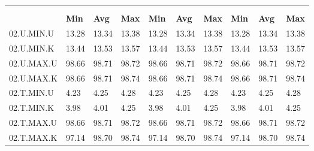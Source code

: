 \begin{tabular}{|>{\raggedright}p{}|>{\raggedright}p{}|>{\raggedright}p{}|>{\raggedright}p{}|>{\raggedright}p{}|>{\raggedright}p{}|>{\raggedright}p{}|>{\raggedright}p{}|>{\raggedright}p{}|>{\raggedright}p{}|}
\hline 
\multirow{3}{0.12\columnwidth}{\textbf{\footnotesize{}Bezeichnung}} & \multicolumn{9}{l|}{\textbf{\footnotesize{}TX-Bitrate {[}MBit/s{]}}}\tabularnewline
\cline{2-10} 
& \multicolumn{3}{l|}{\textbf{\footnotesize{}prp1}} & \multicolumn{3}{l|}{\textbf{\footnotesize{}eth0}} & \multicolumn{3}{l|}{\textbf{\footnotesize{}eth1}}\tabularnewline
\cline{2-10} 
& \textbf{\footnotesize{}Min} & \textbf{\footnotesize{}Avg} & \textbf{\footnotesize{}Max} & \textbf{\footnotesize{}Min} & \textbf{\footnotesize{}Avg} & \textbf{\footnotesize{}Max} & \textbf{\footnotesize{}Min} & \textbf{\footnotesize{}Avg} & \textbf{\footnotesize{}Max}\tabularnewline
\hline 
\hline 
{\footnotesize{}02.U.MIN.U} & {\footnotesize{}13.28} & {\footnotesize{}13.34} & {\footnotesize{}13.38} & {\footnotesize{}13.28} & {\footnotesize{}13.34} & {\footnotesize{}13.38} & {\footnotesize{}13.28} & {\footnotesize{}13.34} & {\footnotesize{}13.38}\tabularnewline
\hline 
\hline 
{\footnotesize{}02.U.MIN.K} & {\footnotesize{}13.44} & {\footnotesize{}13.53} & {\footnotesize{}13.57} & {\footnotesize{}13.44} & {\footnotesize{}13.53} & {\footnotesize{}13.57} & {\footnotesize{}13.44} & {\footnotesize{}13.53} & {\footnotesize{}13.57}\tabularnewline
\hline 
\hline 
{\footnotesize{}02.U.MAX.U} & {\footnotesize{}98.66} & {\footnotesize{}98.71} & {\footnotesize{}98.72} & {\footnotesize{}98.66} & {\footnotesize{}98.71} & {\footnotesize{}98.72} & {\footnotesize{}98.66} & {\footnotesize{}98.71} & {\footnotesize{}98.72}\tabularnewline
\hline 
\hline 
{\footnotesize{}02.U.MAX.K} & {\footnotesize{}98.66} & {\footnotesize{}98.71} & {\footnotesize{}98.74} & {\footnotesize{}98.66} & {\footnotesize{}98.71} & {\footnotesize{}98.74} & {\footnotesize{}98.66} & {\footnotesize{}98.71} & {\footnotesize{}98.74}\tabularnewline
\hline 
\hline 
{\footnotesize{}02.T.MIN.U} & {\footnotesize{}4.23} & {\footnotesize{}4.25} & {\footnotesize{}4.28} & {\footnotesize{}4.23} & {\footnotesize{}4.25} & {\footnotesize{}4.28} & {\footnotesize{}4.23} & {\footnotesize{}4.25} & {\footnotesize{}4.28}\tabularnewline
\hline 
\hline 
{\footnotesize{}02.T.MIN.K} & {\footnotesize{}3.98} & {\footnotesize{}4.01} & {\footnotesize{}4.25} & {\footnotesize{}3.98} & {\footnotesize{}4.01} & {\footnotesize{}4.25} & {\footnotesize{}3.98} & {\footnotesize{}4.01} & {\footnotesize{}4.25}\tabularnewline
\hline 
\hline 
{\footnotesize{}02.T.MAX.U} & {\footnotesize{}98.66} & {\footnotesize{}98.71} & {\footnotesize{}98.72} & {\footnotesize{}98.66} & {\footnotesize{}98.71} & {\footnotesize{}98.72} & {\footnotesize{}98.66} & {\footnotesize{}98.71} & {\footnotesize{}98.72}\tabularnewline
\hline 
\hline 
{\footnotesize{}02.T.MAX.K} & {\footnotesize{}97.14} & {\footnotesize{}98.70} & {\footnotesize{}98.74} & {\footnotesize{}97.14} & {\footnotesize{}98.70} & {\footnotesize{}98.74} & {\footnotesize{}97.14} & {\footnotesize{}98.70} & {\footnotesize{}98.74}\tabularnewline
\hline 
\end{tabular}
\par
